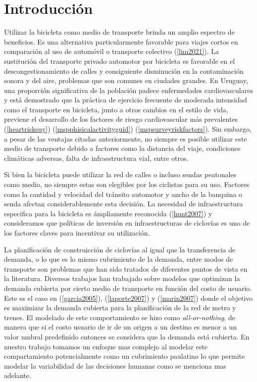 \documentclass{article}
\begin{document}
  \section{Introducción}

  Utilizar la bicicleta como medio de transporte brinda un amplio espectro de beneficios. Es una alternativa particularmente favorable para viajes cortos en comparación al uso de automóvil o transporte colectivo (\ref{lim2021}). La sustitución del transporte privado automotor por bicicleta es favorable en el descongestionamiento de calles y consiguiente disminución en la contaminación sonora y del aire, problemas que son comunes en ciudades grandes. En Uruguay, una proporción significativa de la población padece enfermedades cardiovasculares y está demostrado que la práctica de ejercicio frecuente de moderada intensidad como el transporte en bicicleta, junto a otros cambios en el estilo de vida, previene el desarrollo de los factores de riesgo cardiovascular más prevalentes (\ref{heartrisksuy}) (\ref{mspphisicalactivityguid}) (\ref{mspsurveyriskfactors}). Sin embargo, a pesar de las ventajas citadas anteriormente, no siempre es posible utilizar este medio de transporte debido a factores como la distancia del viaje, condiciones climáticas adversas, falta de infraestructura vial, entre otros.

  Si bien la bicicleta puede utilizar la red de calles o incluso sendas peatonales como medio, no siempre estas son elegibles por los ciclistas para su uso. Factores como la cantidad y velocidad del tránsito automotor y ancho de la banquina o senda afectan considerablemente esta decisión. La necesidad de infraestructura especifica para la bicicleta es ámpliamente reconocida (\ref{hunt2007}) y consideramos que políticas de inversión en infraestructuras de ciclovías es uno de los factores claves para incentivar su utilización.

  La planificación de construicción de ciclovías al igual que la transferencia de demanda, o lo que es lo mismo cubrimiento de la demanda, entre modos de transporte son problemas que han sido tratados de diferentes puntos de vista en la literatura. Diversos trabajos han trabajado sobre modelos que optimizan la demanda cubierta por cierto medio de transporte en función del costo de usuario. Este es el caso en (\ref{garcia2005}), (\ref{laporte2007}) y (\ref{marin2007}) donde el objetivo es maximizar la demanda cubierta para la planificación de la red de metro y trenes. El modelado de este comportamiento se hizo como {\it all-or-nothing}, de manera que si el costo usuario de ir de un origen a un destino es menor a un valor umbral predefinido entonces se considera que la demanda está cubierta. En nuestro trabajo tomamos un enfoque mas complejo al modelar este compartamiento potencialmente como un cubrimiento paulatino lo que permite modelar la variabilidad de las decisiones humanas como se menciona mas adelante.
\end{document}
